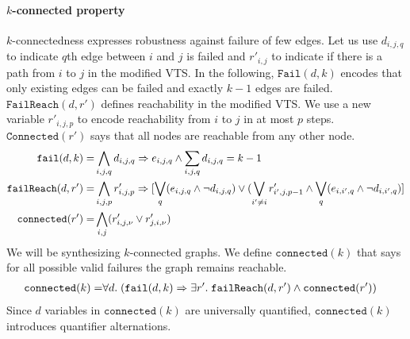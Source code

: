 \paragraph{$k$-connected property}
%
$k$-connectedness expresses robustness against failure of few edges.
%
Let us use $d_{i,j,q}$ to indicate $q$th edge between $i$ and $j$ is failed
and $r'_{i,j}$ to indicate if there is a path from $i$ to $j$ in
the modified VTS.
%
%
In the following, $\texttt{Fail}(d,k)$ encodes that only
existing edges can be failed and exactly $k-1$ edges are failed.
%
$\texttt{FailReach}(d,r')$ defines reachability in the modified VTS.
%
We use a new variable $r'_{i,j,p}$ to encode reachability from
$i$ to $j$ in at most $p$ steps.
%
$\texttt{Connected}(r')$ says that all nodes are reachable from any
other node.
\begin{align*}
  \texttt{fail}(d,k) = & 
  \bigwedge\limits_{i,j,q} d_{i,j,q} \Rightarrow e_{i,j,q}  \land 
  \sum_{i,j,q} d_{i,j,q} = k-1\\
  \texttt{failReach}(d,r') = &
   \bigwedge\limits_{i,j,p}  r^{\prime}_{i,j,p} \Rightarrow [\bigvee_{q} (e_{i,j,q} \land  \neg d_{i,j,q}) \lor  (\bigvee_{i' \neq i}  r^{\prime}_{i',j,p-1} \land  \bigvee_{q} (e_{i,i',q} \land \neg d_{i,i',q}) ]\\
  \texttt{connected}(r') = & \bigwedge\limits_{i,j} (r^{\prime}_{i,j,\nu} \lor r^{\prime}_{j,i,\nu})
\end{align*}
We will be synthesizing $k$-connected graphs.
%
We define $\texttt{connected}(k)$ that says for all possible valid failures
the graph remains reachable. 
\begin{align*}
  \texttt{connected}(k) = & \forall d.\;
          (\texttt{fail}(d,k) \Rightarrow \exists r'.\;\texttt{failReach}(d,r')
                                \land \texttt{connected}(r'))
\end{align*}
Since $d$ variables in $\texttt{connected}(k)$ are universally
quantified, $\texttt{connected}(k)$ introduces quantifier alternations.
%




